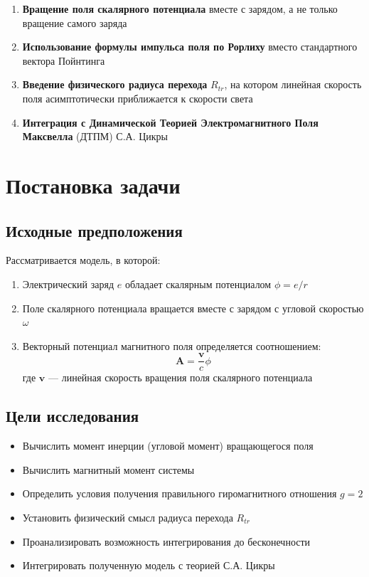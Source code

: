 \documentclass[12pt,a4paper]{article}
\begin{document}
\begin{enumerate}
    \item \textbf{Вращение поля скалярного потенциала} вместе с зарядом, а не только вращение самого заряда
    \item \textbf{Использование формулы импульса поля по Рорлиху} вместо стандартного вектора Пойнтинга
    \item \textbf{Введение физического радиуса перехода} $R_{tr}$, на котором линейная скорость поля асимптотически приближается к скорости света
    \item \textbf{Интеграция с Динамической Теорией Электромагнитного Поля Максвелла} (ДТПМ) С.А. Цикры
\end{enumerate}

\section{Постановка задачи}

\subsection{Исходные предположения}

Рассматривается модель, в которой:

\begin{enumerate}
    \item Электрический заряд $e$ обладает скалярным потенциалом $\phi = e/r$
    \item Поле скалярного потенциала вращается вместе с зарядом с угловой скоростью $\omega$
    \item Векторный потенциал магнитного поля определяется соотношением:
    \begin{equation}
        \mathbf{A} = \frac{\mathbf{v}}{c} \phi
    \end{equation}
    где $\mathbf{v}$ --- линейная скорость вращения поля скалярного потенциала
\end{enumerate}

\subsection{Цели исследования}

\begin{itemize}
    \item Вычислить момент инерции (угловой момент) вращающегося поля
    \item Вычислить магнитный момент системы
    \item Определить условия получения правильного гиромагнитного отношения $g = 2$
    \item Установить физический смысл радиуса перехода $R_{tr}$
    \item Проанализировать возможность интегрирования до бесконечности
    \item Интегрировать полученную модель с теорией С.А. Цикры
\end{itemize}
\end{document}
